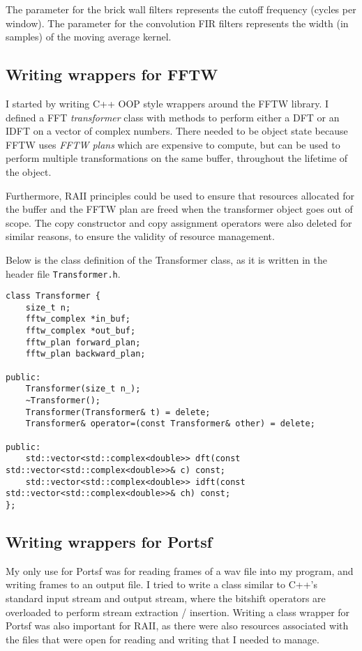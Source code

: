 The parameter for the brick wall filters represents the cutoff frequency (cycles per window).
The parameter for the convolution FIR filters represents the width (in samples) of the moving average kernel.

\pagebreak 

\subsection{Writing wrappers for FFTW}
I started by writing C++ OOP style wrappers around the FFTW library. 
I defined a FFT \emph{transformer} class with methods to perform either a DFT or an IDFT on a vector of complex numbers.
There needed to be object state because FFTW uses \emph{FFTW plans} which are expensive to compute, but
can be used to perform multiple transformations on the same buffer, throughout the lifetime of the object.

Furthermore, RAII principles could be used to ensure that resources allocated for the buffer and the FFTW 
plan are freed when the transformer object goes out of scope.
The copy constructor and copy assignment operators were also deleted for similar reasons,
to ensure the validity of resource management.

Below is the class definition of the Transformer class, as it is written in the header file \verb|Transformer.h|.
\begin{verbatim}
class Transformer {
    size_t n;
    fftw_complex *in_buf;
    fftw_complex *out_buf;
    fftw_plan forward_plan;
    fftw_plan backward_plan;

public:
    Transformer(size_t n_);
    ~Transformer();
    Transformer(Transformer& t) = delete;
    Transformer& operator=(const Transformer& other) = delete;

public:
    std::vector<std::complex<double>> dft(const std::vector<std::complex<double>>& c) const;
    std::vector<std::complex<double>> idft(const std::vector<std::complex<double>>& ch) const;
};
\end{verbatim}

\pagebreak

\subsection{Writing wrappers for Portsf}
My only use for Portsf was for reading frames of a wav file into my program,
and writing frames to an output file. 
I tried to write a class similar to C++'s standard input stream and output stream,
where the bitshift operators are overloaded to perform stream extraction / insertion.
Writing a class wrapper for Portsf was also important for RAII, as there
were also resources associated with the files that were open for reading and writing
that I needed to manage.

